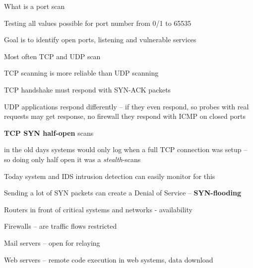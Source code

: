 \documentclass[Screen16to9,17pt]{foils}
\begin{document}
\begin{list2}
\item What is a port scan
\item Testing all values possible for port number from 0/1 to 65535
\item Goal is to identify open ports, listening and vulnerable services
\item Most often TCP and UDP scan
\item TCP scanning is more reliable than UDP scanning
\item TCP handshake must respond with SYN-ACK packets
\item UDP applications respond differently -- if they even respond, so probes with real requests may get response, no firewall they respond with ICMP on closed ports
\end{list2}



\begin{list2}
\item {\bfseries TCP SYN half-open} scans
\item in the old days systems would only log when a full TCP connection was setup
  -- so doing only half open it was a \emph{stealth}-scans
\item Today system and IDS intrusion detection can easily monitor for this
\item Sending a lot of SYN packets can create a Denial of Service -- {\bfseries SYN-flooding}
\end{list2}



\begin{list2}
\item Routers in front of critical systems and networks - availability
\item Firewalls -- are traffic flows restricted
\item Mail servers -- open for relaying
\item Web servers -- remote code execution in web systems, data download
\end{list2}

\end{document}
